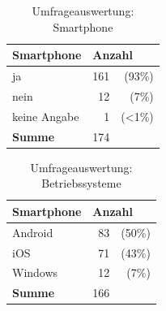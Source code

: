 \begin{table}[H]
\begin{center}
\begin{footnotesize}
\begin{tabular}{| l | r  r |}  \hline                       
  \textbf{Smartphone}              & \multicolumn{2}{|l|}{\textbf{Anzahl}}   \\ \hline 
  ja        &  161 &   (93\%)  \\  \hline  
  nein        &  12  &   (7\%)  \\  \hline  
  keine Angabe    &  1   &   (<1\%)  \\  \hline  
  \textbf{Summe}  & 174  &   \\  \hline  
\end{tabular}
\end{footnotesize}
\caption{Umfrageauswertung: Smartphone}
\label{tab:smartphone}
\end{center}
\end{table}

\begin{table}[H]
\begin{center}
\begin{footnotesize}
\begin{tabular}{| l | r  r |}  \hline                       
  \textbf{Smartphone}              & \multicolumn{2}{|l|}{\textbf{Anzahl}}   \\ \hline 
  Android    &  83 &   (50\%)  \\  \hline  
  iOS        &  71  &   (43\%)  \\  \hline  
  Windows    &  12   &   (7\%)  \\  \hline  
  \textbf{Summe}  & 166  &   \\  \hline  
\end{tabular}
\end{footnotesize}
\caption{Umfrageauswertung: Betriebssysteme}
\label{tab:os}
\end{center}
\end{table}

